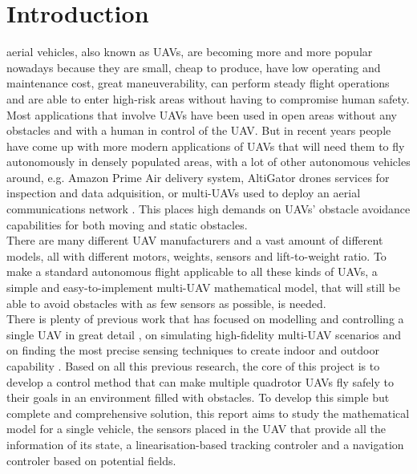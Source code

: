 \documentclass[journal]{IEEEtran}
\begin{document}
	\section{Introduction}
	 aerial vehicles, also known as UAVs, are becoming more and more popular nowadays because they are small, cheap to produce, have low operating and maintenance cost, great maneuverability, can perform steady flight operations and are able to enter high-risk areas without having to compromise human safety. Most applications that involve UAVs have been used in open areas without any obstacles and with a human in control of the UAV. But in recent years people have come up with more modern applications of UAVs that will need them to fly autonomously in densely populated areas, with a lot of other autonomous vehicles around, e.g. Amazon Prime Air delivery system, AltiGator drones services for inspection and data adquisition, or multi-UAVs used to deploy an aerial communications network \cite{intro_network}. This places high demands on UAVs’ obstacle avoidance capabilities for both moving and static obstacles.\\
	
	There are many different UAV manufacturers and a vast amount of different models, all with different motors, weights, sensors and lift-to-weight ratio. To make a standard autonomous flight applicable to all these kinds of UAVs, a simple and easy-to-implement multi-UAV mathematical model, that will still be able to avoid obstacles with as few sensors as possible, is needed.\\
	
	 There is plenty of previous work that has focused on modelling and controlling a single UAV in great detail \cite{intro_nolinear_model_control}, on simulating high-fidelity multi-UAV scenarios \cite{intro_3d_unity} and on finding the most precise sensing techniques to create indoor and outdoor capability \cite{intro_indoor_sensing}. Based on all this previous research, the core of this project is to develop a control method that can make multiple quadrotor UAVs fly safely to their goals in an environment filled with obstacles. To develop this simple but complete and comprehensive solution, this report aims to study the mathematical model for a single vehicle, the sensors placed in the UAV that provide all the information of its state, a linearisation-based tracking controler and a navigation controler based on potential fields. \\
	
\end{document}
